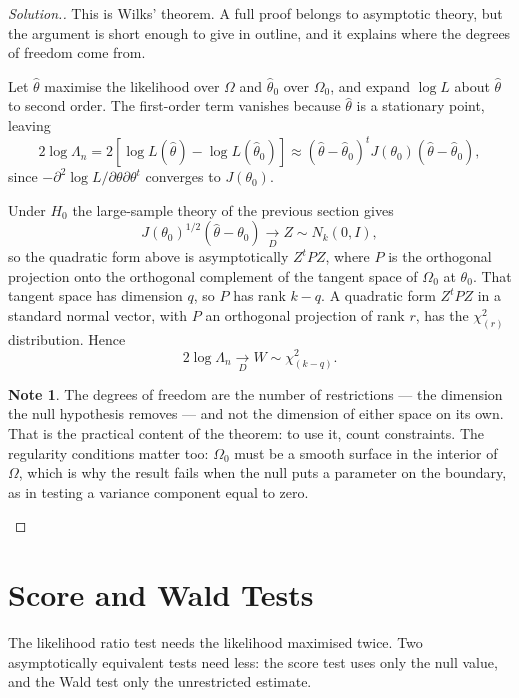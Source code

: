 \documentclass[12pt,a4paper]{report}
\theoremstyle{definition}
\newtheorem*{note}{Note}
\newenvironment{solution}
  {\renewcommand{\qedsymbol}{}\begin{proof}[\textit{Solution}.]}
  {\end{proof}}
\begin{document}
\begin{solution}
This is Wilks' theorem. A full proof belongs to asymptotic theory, but the
argument is short enough to give in outline, and it explains where the degrees
of freedom come from.

Let $\widehat{\theta}$ maximise the likelihood over $\Omega$ and
$\widehat{\theta}_0$ over $\Omega_0$, and expand $\log L$ about $\widehat{\theta}$
to second order. The first-order term vanishes because $\widehat{\theta}$ is a
stationary point, leaving
\[2\log\Lambda_n = 2\left[\log L\left(\widehat{\theta}\right) - \log L\left(\widehat{\theta}_0\right)\right]
\approx \left(\widehat{\theta}-\widehat{\theta}_0\right)^{t} J\left(\theta_0\right)
\left(\widehat{\theta}-\widehat{\theta}_0\right),\]
since $-\partial^{2}\log L/\partial\theta\partial\theta^{t}$ converges to
$J(\theta_0)$.

Under $H_0$ the large-sample theory of the previous section gives
\[J\left(\theta_0\right)^{1/2}\left(\widehat{\theta}-\theta_0\right)
\underset{D}{\longrightarrow} Z \sim N_k(0,I),\]
so the quadratic form above is asymptotically $Z^{t}PZ$, where $P$ is the
orthogonal projection onto the orthogonal complement of the tangent space of
$\Omega_0$ at $\theta_0$. That tangent space has dimension $q$, so $P$ has rank
$k-q$. A quadratic form $Z^{t}PZ$ in a standard normal vector, with $P$ an
orthogonal projection of rank $r$, has the $\chi^{2}_{(r)}$ distribution. Hence
\[2\log\Lambda_n \underset{D}{\longrightarrow} W \sim \chi^{2}_{(k-q)} .\]

\begin{note}
The degrees of freedom are the number of restrictions --- the dimension the null
hypothesis removes --- and not the dimension of either space on its own. That is
the practical content of the theorem: to use it, count constraints. The
regularity conditions matter too: $\Omega_0$ must be a smooth surface in the
interior of $\Omega$, which is why the result fails when the null puts a
parameter on the boundary, as in testing a variance component equal to zero.
\end{note}
\end{solution}

\section{Score and Wald Tests}

The likelihood ratio test needs the likelihood maximised twice. Two asymptotically
equivalent tests need less: the score test uses only the null value, and the Wald
test only the unrestricted estimate.
\end{document}
